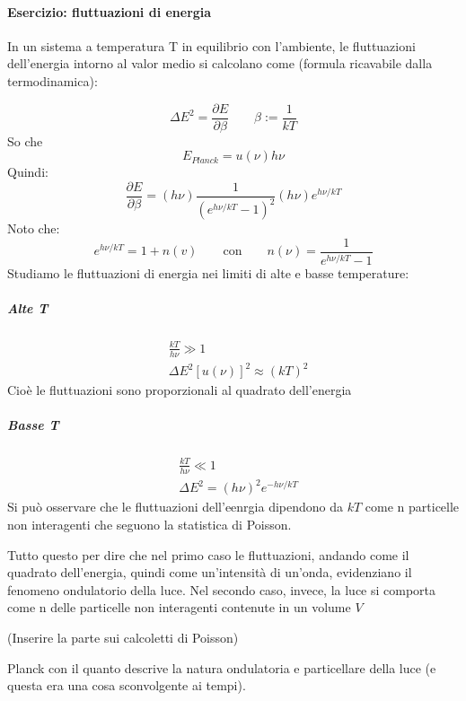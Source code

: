 \documentclass[11pt,a4paper]{article}
\begin{document}
\paragraph{Esercizio: fluttuazioni di energia}

In un sistema a temperatura T in equilibrio con l'ambiente,  le fluttuazioni dell'energia intorno al valor medio si calcolano come (formula ricavabile dalla termodinamica):

\begin{equation}
\Delta E^2 = \frac{\partial E}{\partial \beta} \qquad \beta:=\frac{1}{kT}
\end{equation}
So che
\begin{equation}
E_{Planck} = u(\nu)h\nu
\end{equation}
Quindi:
\begin{equation}
\frac{\partial E}{\partial \beta} = (h\nu)\frac{1}{\left( e^{h\nu/kT}-1 \right)^2} (h\nu) e^{h\nu/kT} 
\end{equation}
Noto che:
\begin{equation}
e^{h\nu/kT} = 1 + n(v) \qquad \text{con} \qquad n(\nu) = \frac{1}{e^{h\nu/kT}-1}
\end{equation}
Studiamo le fluttuazioni di energia nei limiti di alte e basse temperature:

\subparagraph{Alte T}
\begin{align}
& \frac{kT}{h\nu} \gg 1 \\ \nonumber
& \Delta E^2 \left[ u(\nu) \right]^2 \approx (kT)^2
\end{align}
Cioè le fluttuazioni sono proporzionali al quadrato dell'energia

\subparagraph{Basse T}
\begin{align}
& \frac{kT}{h\nu} \ll 1 \\ \nonumber
& \Delta E^2 = (h\nu)^2 e^{-h\nu/kT} 
\end{align}
Si può osservare che le fluttuazioni dell'eenrgia dipendono da $ kT $ come n particelle non interagenti che seguono la statistica di Poisson.

Tutto questo per dire che nel primo caso le fluttuazioni, andando come il quadrato dell'energia, quindi come un'intensità di un'onda, evidenziano il fenomeno ondulatorio della luce.
Nel secondo caso, invece, la luce si comporta come n delle particelle non interagenti contenute in un volume $ V $

(Inserire la parte sui calcoletti di Poisson)

Planck con il quanto descrive la natura ondulatoria e particellare della luce (e questa era una cosa sconvolgente ai tempi).
\end{document}
